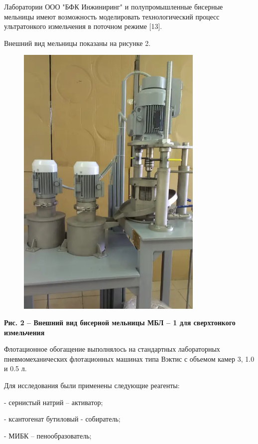 Лаборатории ООО "БФК Инжиниринг" и полупромышленные бисерные мельницы
имеют возможность моделировать технологический процесс ультратонкого
измельчения в поточном режиме {[}13{]}.

Внешний вид мельницы показаны на рисунке 2.

\begin{figure}[H]
	\centering
	\includegraphics[width=0.8\textwidth]{assets/300}
	\caption*{}
\end{figure}

{\bfseries Рис. 2 -- Внешний вид бисерной мельницы МБЛ -- 1 для
сверхтонкого измельчения}

Флотационное обогащение выполнялось на стандартных лабораторных
пневмомеханических флотационных машинах типа Вэктис с объемом камер 3,
1.0 и 0.5 л.

Для исследования были применены следующие реагенты:

- сернистый натрий -- активатор;

- ксантогенат бутиловый - собиратель;

- МИБК -- пенообразователь;

